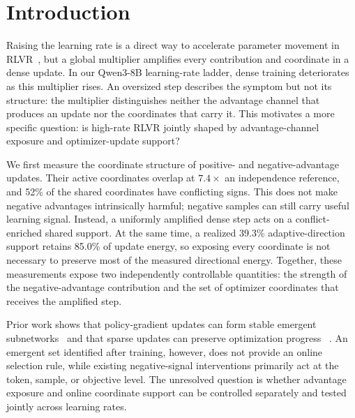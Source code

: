 \documentclass[5p,times]{elsarticle}
\begin{document}
\section{Introduction}\label{sec:intro}
Raising the learning rate is a direct way to accelerate parameter movement in
RLVR~\cite{shao2024deepseekmath,yu2025dapo}, but a global multiplier amplifies
every contribution and coordinate in a dense update. In our Qwen3-8B
learning-rate ladder, dense training deteriorates as this multiplier rises.
An oversized step describes the symptom but not its structure: the multiplier
distinguishes neither the advantage channel that produces an update nor the
coordinates that carry it. This motivates a more specific question: is
high-rate RLVR jointly shaped by advantage-channel exposure and
optimizer-update support?

We first measure the coordinate structure of positive- and
negative-advantage updates. Their active coordinates overlap at $7.4\times$ an
independence reference, and 52\% of the shared coordinates have conflicting
signs. This does not make negative advantages intrinsically harmful; negative
samples can still carry useful learning signal. Instead, a uniformly amplified
dense step acts on a conflict-enriched shared support. At the same time, a
realized 39.3\% adaptive-direction support retains 85.0\% of update energy, so
exposing every coordinate is not necessary to preserve most of the measured
directional energy. Together, these measurements expose two independently
controllable quantities: the strength of the negative-advantage contribution
and the set of optimizer coordinates that receives the amplified step.

Prior work shows that policy-gradient updates can form stable emergent
subnetworks~\cite{mukherjee2025subnetwork,mukherjee2026needadam} and that sparse
updates can preserve optimization progress
~\cite{stich2018sparsified,karimireddy2019errorfeedback,dey2024supar}. An
emergent set identified after training, however, does not provide an online
selection rule, while existing negative-signal interventions primarily act at
the token, sample, or objective level. The unresolved question is whether
advantage exposure and online coordinate support can be controlled separately
and tested jointly across learning rates.
\end{document}
